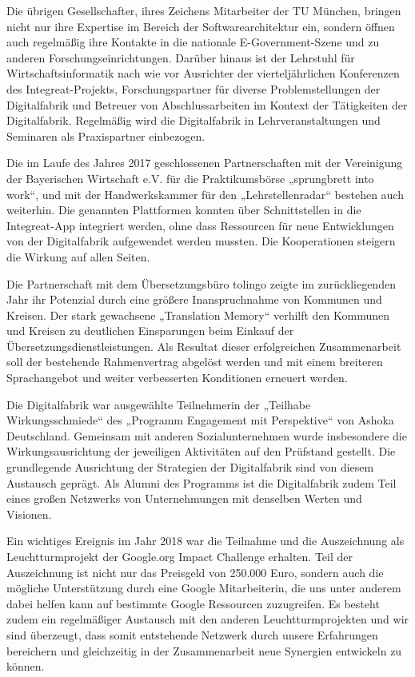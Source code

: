 \documentclass[12pt, a4paper]{article} %
\begin{document}
Die übrigen Gesellschafter, ihres Zeichens Mitarbeiter der TU München,
bringen nicht nur ihre Expertise im Bereich der Softwarearchitektur ein,
sondern öffnen auch regelmäßig ihre Kontakte in die nationale
E-Government-Szene und zu anderen Forschungseinrichtungen. Darüber
hinaus ist der Lehrstuhl für Wirtschaftsinformatik nach wie vor
Ausrichter der vierteljährlichen Konferenzen des Integreat-Projekts,
Forschungspartner für diverse Problemstellungen der Digitalfabrik und
Betreuer von Abschlussarbeiten im Kontext der Tätigkeiten der
Digitalfabrik. Regelmäßig wird die Digitalfabrik in Lehrveranstaltungen
und Seminaren als Praxispartner einbezogen.

Die im Laufe des Jahres 2017 geschlossenen Partnerschaften mit der
Vereinigung der Bayerischen Wirtschaft e.V. für die Praktikumsbörse
„sprungbrett into work“, und mit der Handwerkskammer für den
„Lehrstellenradar“ bestehen auch weiterhin. Die genannten Plattformen
konnten über Schnittstellen in die Integreat-App integriert werden, ohne
dass Ressourcen für neue Entwicklungen von der Digitalfabrik aufgewendet
werden mussten. Die Kooperationen steigern die Wirkung auf allen Seiten.

Die Partnerschaft mit dem Übersetzungsbüro tolingo zeigte im
zurückliegenden Jahr ihr Potenzial durch eine größere Inanspruchnahme
von Kommunen und Kreisen. Der stark gewachsene „Translation Memory“
verhilft den Kommunen und Kreisen zu deutlichen Einsparungen beim
Einkauf der Übersetzungsdienstleistungen. Als Resultat dieser
erfolgreichen Zusammenarbeit soll der bestehende Rahmenvertrag abgelöst
werden und mit einem breiteren Sprachangebot und weiter verbesserten
Konditionen erneuert werden.

Die Digitalfabrik war ausgewählte Teilnehmerin der „Teilhabe
Wirkungsschmiede“ des „Programm Engagement mit Perspektive“ von Ashoka
Deutschland. Gemeinsam mit anderen Sozialunternehmen wurde insbesondere
die Wirkungsausrichtung der jeweiligen Aktivitäten auf den Prüfstand
gestellt. Die grundlegende Ausrichtung der Strategien der Digitalfabrik
sind von diesem Austausch geprägt. Als Alumni des Programms ist die
Digitalfabrik zudem Teil eines großen Netzwerks von Unternehmungen mit
denselben Werten und Visionen.

Ein wichtiges Ereignis im Jahr 2018 war die Teilnahme und die
Auszeichnung als Leuchtturmprojekt der Google.org Impact Challenge
erhalten. Teil der Auszeichnung ist nicht nur das Preisgeld von 250.000
Euro, sondern auch die mögliche Unterstützung durch eine Google
Mitarbeiterin, die uns unter anderem dabei helfen kann auf bestimmte
Google Ressourcen zuzugreifen. Es besteht zudem ein regelmäßiger
Austausch mit den anderen Leuchtturmprojekten und wir sind überzeugt,
dass somit entstehende Netzwerk durch unsere Erfahrungen bereichern und
gleichzeitig in der Zusammenarbeit neue Synergien entwickeln zu können.
\end{document}
